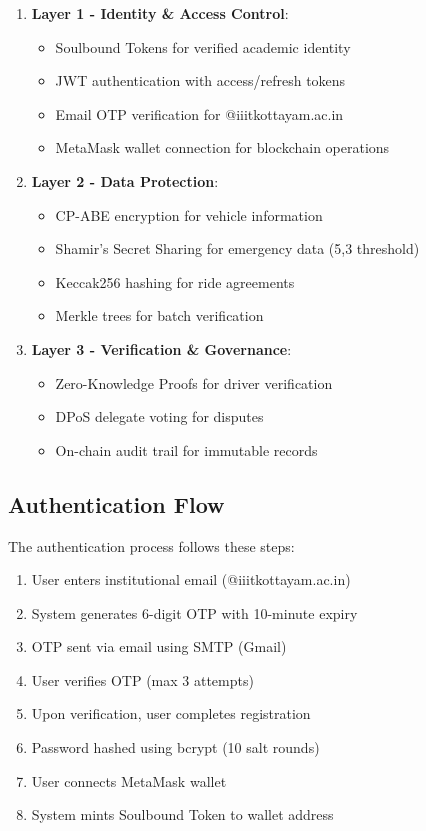 \documentclass[12pt]{report}
\theoremstyle{plain}
\theoremstyle{definition}
\theoremstyle{remark}
\begin{document}
\begin{enumerate}
    \item \textbf{Layer 1 - Identity \& Access Control}:
    \begin{itemize}
        \item Soulbound Tokens for verified academic identity
        \item JWT authentication with access/refresh tokens
        \item Email OTP verification for @iiitkottayam.ac.in
        \item MetaMask wallet connection for blockchain operations
    \end{itemize}
    
    \item \textbf{Layer 2 - Data Protection}:
    \begin{itemize}
        \item CP-ABE encryption for vehicle information
        \item Shamir's Secret Sharing for emergency data (5,3 threshold)
        \item Keccak256 hashing for ride agreements
        \item Merkle trees for batch verification
    \end{itemize}
    
    \item \textbf{Layer 3 - Verification \& Governance}:
    \begin{itemize}
        \item Zero-Knowledge Proofs for driver verification
        \item DPoS delegate voting for disputes
        \item On-chain audit trail for immutable records
    \end{itemize}
\end{enumerate}

\subsection{Authentication Flow}

The authentication process follows these steps:

\begin{enumerate}
    \item User enters institutional email (@iiitkottayam.ac.in)
    \item System generates 6-digit OTP with 10-minute expiry
    \item OTP sent via email using SMTP (Gmail)
    \item User verifies OTP (max 3 attempts)
    \item Upon verification, user completes registration
    \item Password hashed using bcrypt (10 salt rounds)
    \item User connects MetaMask wallet
    \item System mints Soulbound Token to wallet address
\end{enumerate}
\end{document}
